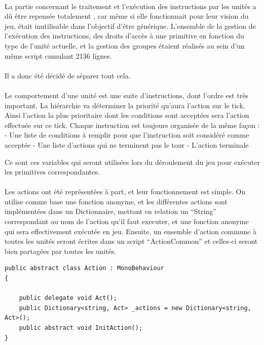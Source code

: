 \documentclass{report}
\begin{document}
\paragraph{}
La partie concernant le traitement et l'exécution des instructions par les unités a dû être repensée totalement , car même si elle fonctionnait pour leur vision du jeu, était inutilisable dans l’objectif d’être générique. 
L’ensemble de la gestion de l'exécution des instructions, des droits d’accès à une primitive en fonction du type de l’unité actuelle, et la gestion des groupes étaient réalisés au sein d’un même script cumulant 2136 lignes.
\paragraph{}
Il a donc été décidé de séparer tout cela.
\paragraph{}
Le comportement d'une unité est une suite d'instructions, dont l'ordre est très important. La hiérarchie va déterminer la priorité qu'aura l'action sur le tick. Ainsi l'action la plus prioritaire dont les conditions sont acceptées sera l'action effectuée sur ce tick.
Chaque instruction est toujours organisée de la même façon :
- Une liste de conditions à remplir pour que l'instruction soit considéré comme acceptée
- Une liste d'actions qui ne terminent pas le tour
- L'action terminale

Ce sont ces variables qui seront utilisées lors du déroulement du jeu pour exécuter les primitives correspondantes.

\paragraph{}

Les actions ont été représentées à part, et leur fonctionnement est simple. On utilise comme base une fonction anonyme, et les différentes actions sont implémentées dans un Dictionnaire, mettant en relation un “String” correspondant au nom de l’action qu’il faut executer, et une fonction anonyme qui sera effectivement exécutée en jeu. Ensuite, un ensemble d’action commune à toutes les unités seront écrites dans un script “ActionCommon” et celles-ci seront bien partagées par toutes les unités. 

\begin{lstlisting}[frame=single]
public abstract class Action : MonoBehaviour
{

    public delegate void Act();
    public Dictionary<string, Act> _actions = new Dictionary<string, Act>();
    public abstract void InitAction();
}
\end{lstlisting}
\end{document}
